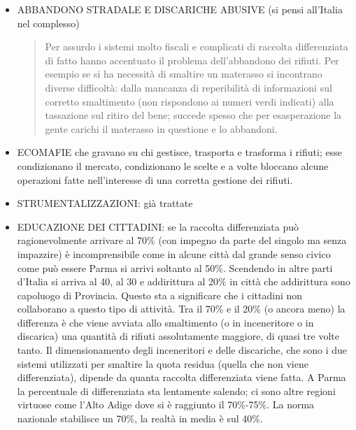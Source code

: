 \begin{itemize}
\item
   
  ABBANDONO STRADALE E DISCARICHE ABUSIVE (si pensi all'Italia nel
  complesso)
   


 \begin{quote}
 

Per assurdo i sistemi molto fiscali e complicati di raccolta
differenziata di fatto hanno accentuato il problema dell'abbandono dei
rifiuti. Per esempio se si ha necessità di smaltire un materasso si
incontrano diverse difficoltà: dalla mancanza di reperibilità di
informazioni sul corretto smaltimento (non rispondono ai numeri verdi
indicati) alla tassazione sul ritiro del bene; succede spesso che per
esasperazione la gente carichi il materasso in questione e lo abbandoni.
  \end{quote}


\item
   
  ECOMAFIE che gravano su chi gestisce, trasporta e trasforma i rifiuti;
  esse condizionano il mercato, condizionano le scelte e a volte
  bloccano alcune operazioni fatte nell'interesse di una corretta
  gestione dei rifiuti.
   
\item
   
  STRUMENTALIZZAZIONI: già trattate
   
\item
   
  EDUCAZIONE DEI CITTADINI: se la raccolta differenziata può
  ragionevolmente arrivare al 70\% (con impegno da parte del singolo ma
  senza impazzire) è incomprensibile come in alcune città dal grande
  senso civico come può essere Parma si arrivi soltanto al 50\%.
  Scendendo in altre parti d'Italia si arriva al 40, al 30 e addirittura
  al 20\% in città che addirittura sono capoluogo di Provincia. Questo
  sta a significare che i cittadini non collaborano a questo tipo di
  attività. Tra il 70\% e il 20\% (o ancora meno) la differenza è che
  viene avviata allo smaltimento (o in inceneritore o in discarica) una
  quantità di rifiuti assolutamente maggiore, di quasi tre volte tanto.
  Il dimensionamento degli inceneritori e delle discariche, che sono i
  due sistemi utilizzati per smaltire la quota residua (quella che non
  viene differenziata), dipende da quanta raccolta differenziata viene
  fatta. A Parma la percentuale di differenziata sta lentamente salendo;
  ci sono altre regioni virtuose come l'Alto Adige dove si è raggiunto
  il 70\%-75\%. La norma nazionale stabilisce un 70\%, la realtà in
  media è sul 40\%.
   
\end{itemize}

